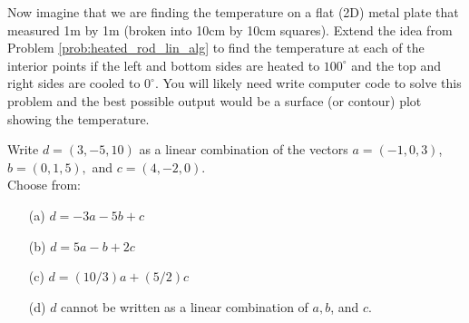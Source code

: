 \begin{problem}
    Now imagine that we are finding the temperature on a flat (2D) metal plate that
    measured 1m
    by 1m (broken into 10cm by 10cm squares).  Extend the idea from Problem
    \ref{prob:heated_rod_lin_alg} to find the temperature at each of
    the interior points if the left and bottom sides are heated to $100^\circ$ and the top
    and right sides are cooled to $0^\circ$.  You will likely need write computer code to
    solve this problem and the best possible output would be a surface (or contour) plot
    showing the temperature.
\end{problem}

\begin{problem}
    Write $d = (3,-5,10)$ as a linear combination of the vectors $a = (-1,0,3)$,
    $b = (0,1,5),$ and $c = (4,-2,0)$. \\
    Choose from:
    \begin{enumerate}
        \item[(a)] $d = -3a - 5b + c$
        \item[(b)] $d = 5a - b + 2c$
        \item[(c)] $d = (10/3)a + (5/2)c$
        \item[(d)] $d$ cannot be written as a linear combination of $a, b$, and $c$.
    \end{enumerate}
\end{problem}

%             
% 


